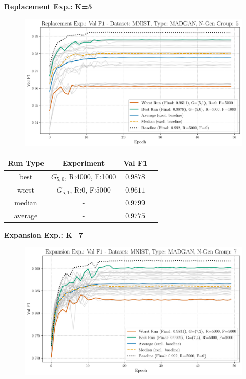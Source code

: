\noindent\textbf{Replacement Exp.: K=5}
\begin{figure}[htbp]
	\centering
	\includegraphics[width=.85\textwidth]{abb/strat_classifier_performance/MNIST_STRATIFIED_CLASSIFIERS_MADGAN_NEW/replacement_experiments/val_f1_score_MADGAN_MNIST_n_gen_5_all.png}
	\label{fig:app_strat_class_performance_replacement_exp._val_f1_score_5}
\end{figure}
\begin{table}[H]
	\vspace{-1em}
	\centering
	\begin{tabular}{|c|c|c|c|}
		\hline
		Run Type & Experiment & Val F1 \\ \hline
		best & \(G_{5, 0}\), R:4000, F:1000 & $0.9878$\\ \hline
		worst & \(G_{5, 1}\), R:0, F:5000 & $0.9611$\\ \hline
		median & - & $0.9799$\\ \hline
		average & - & $0.9775$
		\\ \hline
	\end{tabular}
\end{table}
\newpage
\noindent\textbf{Expansion Exp.: K=7}
\begin{figure}[htbp]
	\centering
	\includegraphics[width=.85\textwidth]{abb/strat_classifier_performance/MNIST_STRATIFIED_CLASSIFIERS_MADGAN_NEW/expansion_experiments/val_f1_score_MADGAN_MNIST_n_gen_7_all.png}
	\label{fig:app_strat_class_performance_expansion_exp._val_f1_score_7}
\end{figure}
